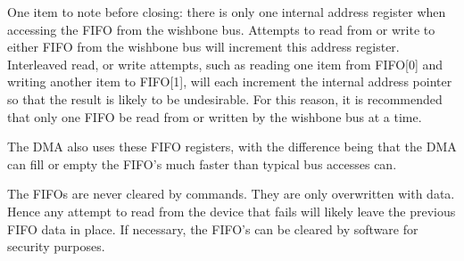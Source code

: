 \documentclass{gqtekspec}
\begin{document}
One item to note before closing: there is only one internal address register
when accessing the FIFO from the wishbone bus.  Attempts to read from or write
to either FIFO from the wishbone bus will increment this address register. 
Interleaved read, or write attempts, such as reading one item from
FIFO[0] and writing another item to FIFO[1], will each increment the internal
address pointer so that the result is likely to be undesirable.  For this
reason, it is recommended that only one FIFO be read from or written by the
wishbone bus at a time.

The DMA also uses these FIFO registers, with the difference being that the DMA
can fill or empty the FIFO's much faster than typical bus accesses can.

The FIFOs are never cleared by commands.  They are only overwritten with data.
Hence any attempt to read from the device that fails will likely leave the
previous FIFO data in place.  If necessary, the FIFO's can be cleared by
software for security purposes.
\end{document}

